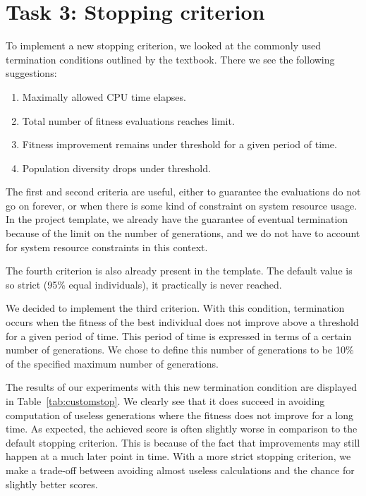 \documentclass{report}
\begin{document}
\section{Task 3: Stopping criterion}
\label{sec:stopping_criterion}
To implement a new stopping criterion, we looked at the commonly used termination conditions outlined by the textbook. There we see the following suggestions:
\begin{enumerate}
	\item Maximally allowed CPU time elapses.
	\item Total number of fitness evaluations reaches limit.
	\item Fitness improvement remains under threshold for a given period of time.
	\item Population diversity drops under threshold.
\end{enumerate}
The first and second criteria are useful, either to guarantee the evaluations do not go on forever, or when there is some kind of constraint on system resource usage. In the project template, we already have the guarantee of eventual termination because of the limit on the number of generations, and we do not have to account for system resource constraints in this context.

The fourth criterion is also already present in the template. The default value is so strict (95\% equal individuals), it practically is never reached.

We decided to implement the third criterion. With this condition, termination occurs when the fitness of the best individual does not improve above a threshold for a given period of time. This period of time is expressed in terms of a certain number of generations. We chose to define this number of generations to be 10\% of the specified maximum number of generations.

The results of our experiments with this new termination condition are displayed in Table~\ref{tab:customstop}. We clearly see that it does succeed in avoiding computation of useless generations where the fitness does not improve for a long time. As expected, the achieved score is often slightly worse in comparison to the default stopping criterion. This is because of the fact that improvements may still happen at a much later point in time. With a more strict stopping criterion, we make a trade-off between avoiding almost useless calculations and the chance for slightly better scores.

\end{document}
